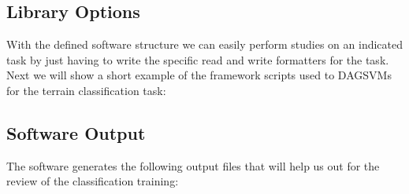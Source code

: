 \documentclass[a4paper,10pt,titlepage]{article}
\begin{document}
\subsection{Library Options}

\par With the defined software structure we can easily perform studies on an indicated task by just having to write the specific
read and write formatters for the task. Next we will show a short example of the framework scripts used to DAGSVMs
for the terrain classification task: 

\lstset{basicstyle=\footnotesize,language=Ruby}
\lstset{linewidth=500pt}
\lstset{numbers=left, stepnumber=1}
\lstset{frame=trBL,frameround=tttt}


\subsection{Software Output}

\par The software generates the following output files that will help us out for the review of the classification training:
\end{document}
